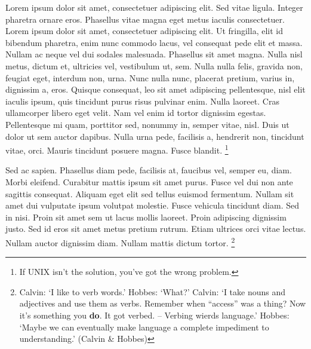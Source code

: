 \documentclass[article,colorback,accentcolor=tud4c]{tudreport}
\begin{document}
    Lorem ipsum dolor sit amet, consectetuer adipiscing elit. Sed vitae ligula. Integer pharetra ornare eros. Phasellus vitae magna eget metus iaculis consectetuer. Lorem ipsum dolor sit amet, consectetuer adipiscing elit. Ut fringilla, elit id bibendum pharetra, enim nunc commodo lacus, vel consequat pede elit et massa. Nullam ac neque vel dui sodales malesuada. Phasellus sit amet magna. Nulla nisl metus, dictum et, ultricies vel, vestibulum ut, sem. Nulla nulla felis, gravida non, feugiat eget, interdum non, urna. Nunc nulla nunc, placerat pretium, varius in, dignissim a, eros. Quisque consequat, leo sit amet adipiscing pellentesque, nisl elit iaculis ipsum, quis tincidunt purus risus pulvinar enim. Nulla laoreet. Cras ullamcorper libero eget velit. Nam vel enim id tortor dignissim egestas. Pellentesque mi quam, porttitor sed, nonummy in, semper vitae, nisl. Duis ut dolor ut sem auctor dapibus. Nulla urna pede, facilisis a, hendrerit non, tincidunt vitae, orci. Mauris tincidunt posuere magna. Fusce blandit.%
    \footnote{If UNIX isn't the solution, you've got the wrong problem.}

    Sed ac sapien. Phasellus diam pede, facilisis at, faucibus vel, semper eu, diam. Morbi eleifend. Curabitur mattis ipsum sit amet purus. Fusce vel dui non ante sagittis consequat. Aliquam eget elit sed tellus euismod fermentum. Nullam sit amet dui vulputate ipsum volutpat molestie. Fusce vehicula tincidunt diam. Sed in nisi. Proin sit amet sem ut lacus mollis laoreet. Proin adipiscing dignissim justo. Sed id eros sit amet metus pretium rutrum. Etiam ultrices orci vitae lectus. Nullam auctor dignissim diam. Nullam mattis dictum tortor.
    \footnote{Calvin: `I like to verb words.' \quad Hobbes: `What?' \quad Calvin: `I take nouns and adjectives
    and use them as verbs. Remember when ``access'' was a thing? Now it's something you \textbf{do}.
    It got verbed. -- Verbing wierds language.' \quad Hobbes: `Maybe we can eventually make language a
    complete impediment to understanding.' (Calvin \& Hobbes)}
    
\end{document}
